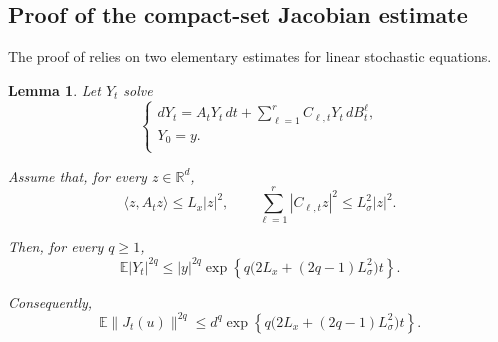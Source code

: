 \documentclass{tsp-short}
\newtheorem{lemma}{Lemma}[section]
\theoremstyle{remark}
\theoremstyle{definition}
\newcommand{\R}{\mathbb{R}} %
\newcommand{\E}{\mathbb E} %
\begin{document}
\subsection{Proof of the compact-set Jacobian estimate}\label{subsec:kt-moment-proof}

The proof of  relies on two elementary estimates for linear stochastic equations.

\begin{lemma}\label{lem:linear-sde-moment}
	Let \(Y_t\) solve
	\begin{equation*}
		\begin{cases}
			dY_t = A_tY_t\,dt + \sum_{\ell=1}^{r} C_{\ell,t}Y_t\,dB_t^\ell, \\
			Y_0=y.                                                          \\
		\end{cases}
	\end{equation*}

	Assume that, for every \(z\in\R^d\),
	\begin{equation*}
		\langle z,A_tz\rangle \le L_x|z|^2, \qquad \sum_{\ell=1}^{r}|C_{\ell,t}z|^2 \le L_\sigma^2|z|^2.
	\end{equation*}

	Then, for every \(q\ge1\),
	\begin{equation*}
		\E|Y_t|^{2q} \le |y|^{2q} \exp\left\{ q\bigl(2L_x+(2q-1)L_\sigma^2\bigr)t \right\}.
	\end{equation*}

	Consequently,
	\begin{equation*}
		\E\|J_t(u)\|^{2q} \le d^q \exp\left\{ q\bigl(2L_x+(2q-1)L_\sigma^2\bigr)t \right\}.
	\end{equation*}
\end{lemma}
\end{document}
